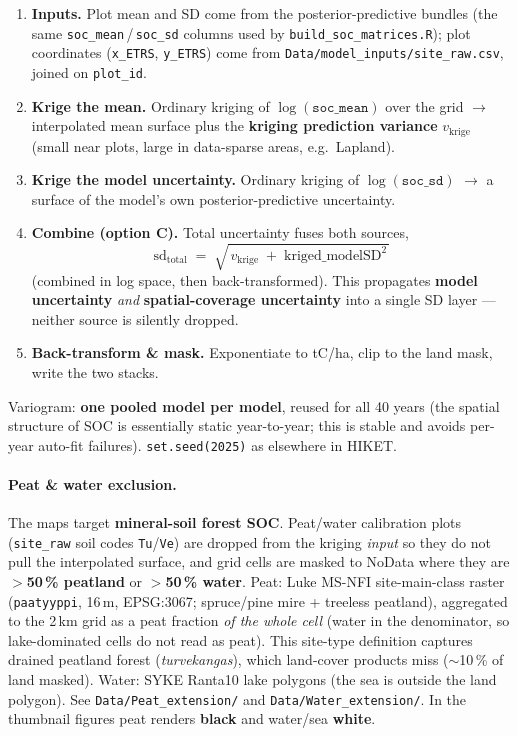 \documentclass[11pt]{article}
\newcommand{\code}[1]{\texttt{\small #1}}
\begin{document}
\begin{enumerate}
\item \textbf{Inputs.} Plot mean and SD come from the posterior-predictive
  bundles (the same \code{soc\_mean}\,/\,\code{soc\_sd} columns used by
  \code{build\_soc\_matrices.R}); plot coordinates (\code{x\_ETRS},
  \code{y\_ETRS}) come from \code{Data/model\_inputs/site\_raw.csv}, joined on
  \code{plot\_id}.
\item \textbf{Krige the mean.} Ordinary kriging of $\log(\texttt{soc\_mean})$
  over the grid $\rightarrow$ interpolated mean surface plus the \textbf{kriging
  prediction variance} $v_{\text{krige}}$ (small near plots, large in
  data-sparse areas, e.g.\ Lapland).
\item \textbf{Krige the model uncertainty.} Ordinary kriging of
  $\log(\texttt{soc\_sd})$ $\rightarrow$ a surface of the model's own
  posterior-predictive uncertainty.
\item \textbf{Combine (option C).} Total uncertainty fuses both sources,
  \[
    \text{sd}_{\text{total}} \;=\; \sqrt{\,v_{\text{krige}} \;+\; \text{kriged\_modelSD}^{2}\,}
  \]
  (combined in log space, then back-transformed). This propagates \textbf{model
  uncertainty} \emph{and} \textbf{spatial-coverage uncertainty} into a single SD
  layer --- neither source is silently dropped.
\item \textbf{Back-transform \& mask.} Exponentiate to tC/ha, clip to the land
  mask, write the two stacks.
\end{enumerate}

Variogram: \textbf{one pooled model per model}, reused for all 40 years (the
spatial structure of SOC is essentially static year-to-year; this is stable and
avoids per-year auto-fit failures). \code{set.seed(2025)} as elsewhere in HIKET.

\paragraph{Peat \& water exclusion.} The maps target \textbf{mineral-soil forest
SOC}. Peat/water calibration plots (\code{site\_raw} soil codes \code{Tu}/\code{Ve})
are dropped from the kriging \emph{input} so they do not pull the interpolated
surface, and grid cells are masked to NoData where they are \textbf{$>$50\,\%
peatland} or \textbf{$>$50\,\% water}. Peat: Luke MS-NFI site-main-class raster
(\code{paatyyppi}, 16\,m, EPSG:3067; spruce/pine mire + treeless peatland),
aggregated to the 2\,km grid as a peat fraction \emph{of the whole cell} (water in
the denominator, so lake-dominated cells do not read as peat). This site-type
definition captures drained peatland forest (\emph{turvekangas}), which land-cover
products miss ($\sim$10\,\% of land masked). Water: SYKE Ranta10 lake polygons
(the sea is outside the land polygon). See \code{Data/Peat\_extension/} and
\code{Data/Water\_extension/}. In the thumbnail figures peat renders \textbf{black}
and water/sea \textbf{white}.
\end{document}
